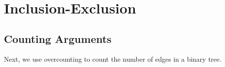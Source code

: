 
\chapter{Inclusion-Exclusion}




\section{Counting Arguments}

Next, we use overcounting to count the number of edges in a binary tree. 
